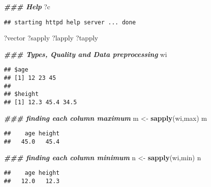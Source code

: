 \documentclass[
]{article}
\newenvironment{Shaded}{\begin{snugshade}}{\end{snugshade}}
\newcommand{\DocumentationTok}[1]{\textcolor[rgb]{0.56,0.35,0.01}{\textbf{\textit{#1}}}}
\newcommand{\FunctionTok}[1]{\textcolor[rgb]{0.13,0.29,0.53}{\textbf{#1}}}
\newcommand{\NormalTok}[1]{#1}
\newcommand{\OtherTok}[1]{\textcolor[rgb]{0.56,0.35,0.01}{#1}}
\begin{document}
\begin{Shaded}
\begin{Highlighting}[]
\DocumentationTok{\#\#\# Help }
\NormalTok{?c}
\end{Highlighting}
\end{Shaded}

\begin{verbatim}
## starting httpd help server ... done
\end{verbatim}

\begin{Shaded}
\begin{Highlighting}[]
\NormalTok{?vector}
\NormalTok{?sapply}
\NormalTok{?lapply}
\NormalTok{?tapply}
\end{Highlighting}
\end{Shaded}

\begin{Shaded}
\begin{Highlighting}[]
\DocumentationTok{\#\#\# Types, Quality and Data preprocessing}
\NormalTok{wi}
\end{Highlighting}
\end{Shaded}

\begin{verbatim}
## $age
## [1] 12 23 45
## 
## $height
## [1] 12.3 45.4 34.5
\end{verbatim}

\begin{Shaded}
\begin{Highlighting}[]
\DocumentationTok{\#\#\# finding each column maximum}
\NormalTok{m }\OtherTok{\textless{}{-}} \FunctionTok{sapply}\NormalTok{(wi,max)}
\NormalTok{m}
\end{Highlighting}
\end{Shaded}

\begin{verbatim}
##    age height 
##   45.0   45.4
\end{verbatim}

\begin{Shaded}
\begin{Highlighting}[]
\DocumentationTok{\#\#\# finding each column minimum}
\NormalTok{n }\OtherTok{\textless{}{-}} \FunctionTok{sapply}\NormalTok{(wi,min)}
\NormalTok{n}
\end{Highlighting}
\end{Shaded}

\begin{verbatim}
##    age height 
##   12.0   12.3
\end{verbatim}
\end{document}
